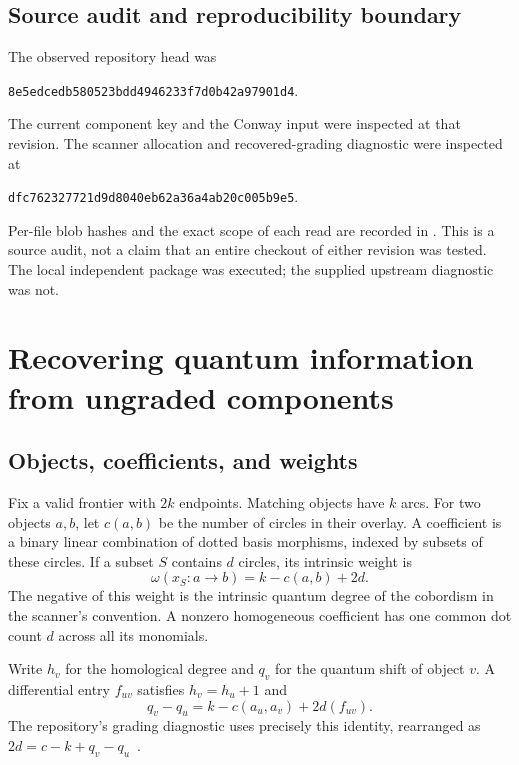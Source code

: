 \documentclass[11pt]{article}
\theoremstyle{definition}
\theoremstyle{remark}
\begin{document}
\subsection{Source audit and reproducibility boundary}
The observed repository head was
\begin{center}\small\texttt{8e5edcedb580523bdd4946233f7d0b42a97901d4}.\end{center}
The current component key and the Conway input were inspected at that
revision. The scanner allocation and recovered-grading diagnostic were
inspected at
\begin{center}\small\texttt{dfc762327721d9d8040eb62a36a4ab20c005b9e5}.\end{center}
Per-file blob hashes and the exact scope of each read are recorded in
. This is a source audit, not a claim that an entire
checkout of either revision was tested. The local independent package was
executed; the supplied upstream diagnostic was not.

\section{Recovering quantum information from ungraded components}
\label{sec:grading}

\subsection{Objects, coefficients, and weights}
Fix a valid frontier with $2k$ endpoints. Matching objects have $k$ arcs.
For two objects $a,b$, let $c(a,b)$ be the number of circles in their overlay.
A coefficient is a binary linear combination of dotted basis morphisms,
indexed by subsets of these circles. If a subset $S$ contains $d$ circles,
its intrinsic weight is
\begin{equation}\label{eq:weight}
 \omega(x_S:a\longrightarrow b)=k-c(a,b)+2d.
\end{equation}
The negative of this weight is the intrinsic quantum degree of the
cobordism in the scanner's convention. A nonzero homogeneous coefficient has
one common dot count $d$ across all its monomials.

Write $h_v$ for the homological degree and $q_v$ for the quantum shift of
object $v$. A differential entry $f_{uv}$ satisfies $h_v=h_u+1$ and
\begin{equation}\label{eq:potential}
 q_v-q_u=k-c(a_u,a_v)+2d(f_{uv}).
\end{equation}
The repository's grading diagnostic uses precisely this identity, rearranged
as $2d=c-k+q_v-q_u$~\cite{grading}.
\end{document}
